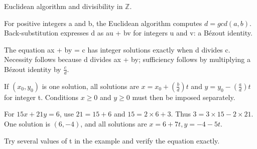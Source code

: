 \documentclass[11pt]{article}
\begin{document}
Euclidean algorithm and divisibility in \(\mathbb{Z}\).\par
{}
For positive integers a and b, the Euclidean algorithm computes \(d = gcd(a,b)\). Back-substitution expresses d as au + bv for integers u and v: a Bézout identity.\par
The equation ax + by = c has integer solutions exactly when d divides c. Necessity follows because d divides ax + by; sufficiency follows by multiplying a Bézout identity by \(\frac{c}{d}\).\par
If \((x_{0},y_{0})\) is one solution, all solutions are \(x = x_{0} + (\frac{b}{d})t\) and \(y = y_{0} - (\frac{a}{d})t\) for integer t. Conditions \(x \geq  0\) and \(y \geq  0\) must then be imposed separately.\par
{}
For \(15x + 21y = 6\), use \(21 = 15 + 6\) and \(15 = 2 \times  6 + 3\). Thus \(3 = 3 \times  15 - 2 \times  21\). One solution is \((6,-4)\), and all solutions are \(x = 6 + 7t, y = -4 - 5t\).\par
{}
Try several values of t in the example and verify the equation exactly.\par
\end{document}

